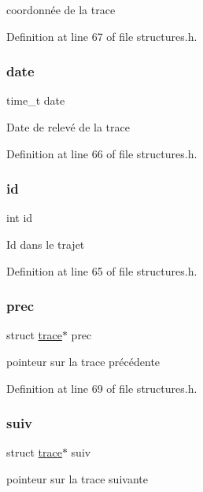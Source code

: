 coordonnée de la trace 

Definition at line 67 of file structures.\+h.

\hypertarget{structtrace_afd1d5f3476eea5753c7c59bfa90777ba}{}\label{structtrace_afd1d5f3476eea5753c7c59bfa90777ba} 
\subsubsection{\texorpdfstring{date}{date}}
{\footnotesize\ttfamily time\+\_\+t date}

Date de relevé de la trace 

Definition at line 66 of file structures.\+h.

\hypertarget{structtrace_a7441ef0865bcb3db9b8064dd7375c1ea}{}\label{structtrace_a7441ef0865bcb3db9b8064dd7375c1ea} 
\subsubsection{\texorpdfstring{id}{id}}
{\footnotesize\ttfamily int id}

Id dans le trajet 

Definition at line 65 of file structures.\+h.

\hypertarget{structtrace_a1967dba5ed4900e2f554b2442863e69e}{}\label{structtrace_a1967dba5ed4900e2f554b2442863e69e} 
\subsubsection{\texorpdfstring{prec}{prec}}
{\footnotesize\ttfamily struct \hyperlink{structtrace}{trace}$\ast$ prec}

pointeur sur la trace précédente 

Definition at line 69 of file structures.\+h.

\hypertarget{structtrace_ab7909a2cccd6f40ca9499c850c9c948c}{}\label{structtrace_ab7909a2cccd6f40ca9499c850c9c948c} 
\subsubsection{\texorpdfstring{suiv}{suiv}}
{\footnotesize\ttfamily struct \hyperlink{structtrace}{trace}$\ast$ suiv}

pointeur sur la trace suivante 

